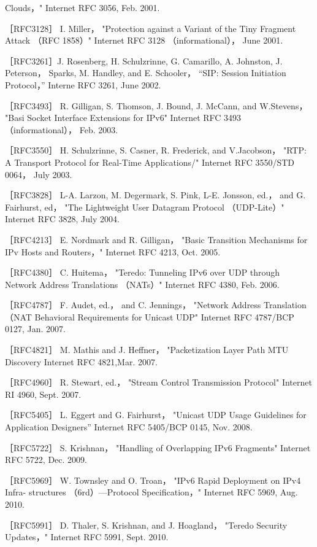 Clouds，" Internet RFC 3056, Feb. 2001.

［RFC3128］ I. Miller， "Protection against a Variant of the Tiny Fragment Attack
（RFC 1858）" Internet RFC 3128 （informational）， June 2001.

［RFC3261］J. Rosenberg, H. Schulzrinne, G. Camarillo, A. Johnston, J. Peterson，
Sparks, M. Handley, and E. Schooler， “SIP: Session Initiation Protocol，” Interne
RFC 3261, June 2002.

［RFC3493］ R. Gilligan, S. Thomson, J. Bound, J. McCann, and W.Stevens， "Basi
Socket Interface Extensions for IPv6" Internet RFC 3493 （informational）， Feb.
2003.

［RFC3550］ H. Schulzrinne, S. Casner, R. Frederick, and V.Jacobson， "RTP: A
Transport Protocol for Real-Time Applications/" Internet RFC 3550/STD 0064，
July 2003.

［RFC3828］ L-A. Larzon, M. Degermark, S. Pink, L-E. Jonsson, ed.， and G.
Fairhurst, ed， "The Lightweight User Datagram Protocol （UDP-Lite）" Internet
RFC 3828, July 2004.

［RFC4213］ E. Nordmark and R. Gilligan， "Basic Transition Mechanisms for IPv
Hosts and Routers，" Internet RFC 4213, Oct. 2005.

［RFC4380］ C. Huitema， "Teredo: Tunneling IPv6 over UDP through Network
Address Translations （NATs）" Internet RFC 4380, Feb. 2006.

［RFC4787］ F. Audet, ed.， and C. Jennings， "Network Address Translation （NAT
Behavioral Requirements for Unicast UDP" Internet RFC 4787/BCP 0127, Jan.
2007.

［RFC4821］ M. Mathis and J. Heffner， "Packetization Layer Path MTU Discovery
Internet RFC 4821,Mar. 2007.

［RFC4960］ R. Stewart, ed.， "Stream Control Transmission Protocol" Internet RI
4960, Sept. 2007.

［RFC5405］ L. Eggert and G. Fairhurst， "Unicast UDP Usage Guidelines for
Application Designers” Internet RFC 5405/BCP 0145, Nov. 2008.

［RFC5722］ S. Krishnan， "Handling of Overlapping IPv6 Fragments" Internet
RFC 5722, Dec. 2009.

［RFC5969］ W. Townsley and O. Troan， "IPv6 Rapid Deployment on IPv4 Infra-
structures （6rd）—Protocol Specification，" Internet RFC 5969, Aug. 2010.

［RFC5991］ D. Thaler, S. Krishnan, and J. Hoagland， "Teredo Security Updates，"
Internet RFC 5991, Sept. 2010.

